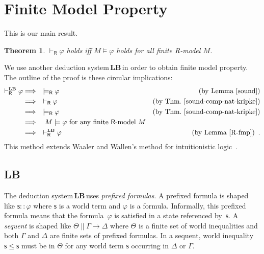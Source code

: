 \documentclass[doctor]{iscs-thesis}
\newcommand{\vdashR}{\vdash_{\mathsf R}}
\newcommand{\vdashRLB}{\vdashR^{\mbox{\tiny \LB}}}
\newcommand{\modelsR}{\models_{\mathsf R}}
\newtheorem{theorem}{Theorem}
\newcommand{\LB}{\textbf{LB}}
\begin{document}
\section{Finite Model Property}
\label{fmp-proof}

This is our main result.
\begin{theorem}
 \label{thm:fmp}
 $\vdashR\varphi$ holds iff $M\models \varphi$ holds
 for all finite {\sf R}-model $M$.
\end{theorem}

We use another deduction system\,\LB\,in order to obtain finite model
property.
The outline of the proof is these circular implications:
\begin{align*}
 \vdashRLB\varphi &\Longrightarrow \quad \models_{\mathsf R}\varphi\quad
 &(\mbox{by Lemma~\ref{sound}})\\
 &\Longrightarrow \quad \vdash_{\mathsf R}\varphi &(\mbox{by
 Thm.~\ref{sound-comp-nat-kripke}}) \\
 &\Longrightarrow\quad \modelsR\varphi &\mbox{(by Thm.~\ref{sound-comp-nat-kripke})}\\
 &\Longrightarrow\quad M\models\varphi \mbox{ for any finite $\mathsf
 R$-model }M\\
 &\Longrightarrow\quad \vdashRLB\varphi & (\mbox{by
 Lemma~\ref{R-fmp}})\enspace .
\end{align*}
This method extends Waaler
and Wallen's method for intuitionistic logic~\cite{waaler1999tableaux}.

\subsection{\LB}

The deduction system\,\LB\,uses \textit{prefixed formulas}.  A
prefixed formula is shaped like $\mathsf s::\varphi$ where $\mathsf s $
is a world term and $\varphi$ is a formula.
Informally, this prefixed formula means that the formula~$\varphi$ is
satisfied in a state referenced by~$\mathsf s$.
A \textit{sequent} is shaped like
  $\Theta\parallel \Gamma\longrightarrow \Delta$ where
$\Theta$ is a finite set of world inequalities and both
$\Gamma$ and $\Delta$ are finite sets of prefixed formulas.
In a sequent, world inequality
$\mathsf s\le \mathsf s$ must be in $\Theta$
 for any world term $\mathsf s$ occurring in $\Delta$ or $\Gamma$.
\end{document}
